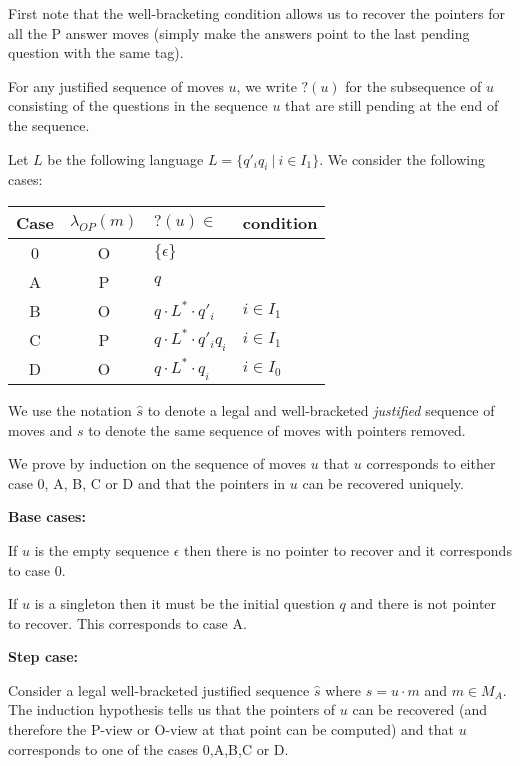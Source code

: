 \def\justseq#1{\xymatrix @=12pt@M=0pt{ #1 }}
\def\pointto#1{\ar@/_/[#1]}

\def\oview#1{\llcorner #1 \lrcorner}
\def\seq#1{\langle #1 \rangle}

First note that the well-bracketing condition allows us to recover
the pointers for all the P answer moves (simply make the answers point
to the last pending question with the same tag).

For any justified sequence of moves $u$, we write $?(u)$ for the subsequence of $u$ consisting of the questions in the sequence $u$ that are still pending at the end of the sequence.

Let $L$ be the following language $L = \{ q'_i q_i\ | \ i \in I_1 \}$.
We consider the following cases:

\begin{center}
\begin{tabular}{c|c|l|l}
Case & $\lambda_{OP}(m)$ & $?(u) \in$ & condition \\ \hline
0 & O & $\{ \epsilon \}$ \\
A & P & $q$ \\
B & O & $q \cdot L^* \cdot q'_i$     & $i \in I_1$ \\
C & P & $q \cdot L^* \cdot q'_i q_i$ & $i \in I_1$ \\
D & O & $q \cdot L^* \cdot q_i$      & $i \in I_0$ \\
\end{tabular}
\end{center}

We use the notation $\hat{s}$ to denote a legal and well-bracketed \emph{justified} sequence of moves and
$s$ to denote the same sequence of moves with pointers removed.

We prove by induction on the sequence of moves $u$ that $u$ corresponds to either
case 0, A, B, C or D and that the pointers in $u$ can be recovered uniquely.

\textbf{Base cases:}

If $u$ is the empty sequence $\epsilon$ then there is no pointer to recover and it corresponds to case 0.

If $u$ is a singleton then it must be the initial question $q$ and there is not pointer to recover. This corresponds
to case A.

\textbf{Step case:}

Consider a legal well-bracketed justified sequence $\hat{s}$ where $s = u \cdot m$ and $m \in M_A$.
The induction hypothesis tells us
that the pointers of $u$ can be recovered (and therefore the P-view or O-view at that point can be
computed) and that $u$ corresponds to one of the cases 0,A,B,C or D.

